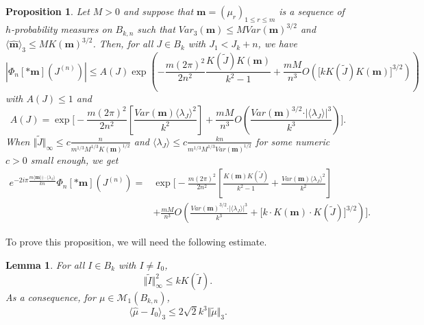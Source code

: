 \documentclass[10pt,11pt]{amsart}%
\newtheorem{lemma}[theorem]{Lemma}
\newtheorem{proposition}[theorem]{Proposition}
\begin{document}
\begin{proposition}\label{prop:convergence_fourier}
Let $M>0$ and suppose that $\mathbf{m}=(\mu_r)_{1\leq r\leq m}$ is a sequence of $h$-probability measures on $ B_{k,n}$ such that $Var_{3}(\mathbf{m})\leq M Var(\mathbf{m})^{3/2}$ and $\langle\widehat{\mathbf{m}}\rangle_3\leq MK(\mathbf{m})
^{3/2}$. Then, for all $J\in B_{k}$ with $J_1<J_k+n$, we have 
$$\left\vert\Phi_{n}[*\mathbf{m}](J^{(n)})\right\vert \leq A(J) \exp\left(-\frac{m(2\pi)^2}{2n^2}\frac{K(\tilde{J})K(\mathbf{m})}{k^2-1}+\frac{mM}{n^3}O\left(\Big[kK(\tilde{J})K(\mathbf{m})\Big]^{3/2}\right)\right)$$
with $A(J)\leq 1$ and 
$$A(J)=\exp\Bigg[-\frac{m(2\pi)^2}{2n^2}\left[\frac{Var(\mathbf{m})\langle \lambda_J\rangle^2}{k^2}\right]+\frac{mM}{n^3}O\left(\frac{Var(\mathbf{m})^{3/2}\cdot\vert\langle \lambda_J\rangle\vert^3}{k^3}\right)\Bigg].$$
When $\Vert \tilde{J}\Vert_{\infty}\leq c\frac{n}{m^{1/3}M^{1/3}K(\mathbf{m})^{1/2}}$ and $\langle \lambda_J\rangle\leq c\frac{kn}{m^{1/3}M^{1/3}Var(\mathbf{m})^{1/2}}$ for some numeric $c>0$ small enough, we get
\begin{align*}
e^{-2i \pi \frac{m\langle\mathbf{m}\rangle)\cdot\langle \lambda_J\rangle}{kn}}\Phi_{n}[*\mathbf{m}](J^{(n)})
=&\exp\Bigg[-\frac{m(2\pi)^2}{2n^2}\left[\frac{K(\mathbf{m})K(\tilde{J})}{k^2-1}+\frac{Var(\mathbf{m})\langle \lambda_J\rangle^2}{k^2}\right]\\
&+\frac{mM}{n^3}O\left(\frac{Var(\mathbf{m})^{3/2}\cdot\vert\langle \lambda_J\rangle\vert^3}{k^3}+\Big[k \cdot K(\mathbf{m})\cdot K(\tilde{J})\Big]^{3/2}\right)\Bigg].
\end{align*}

\end{proposition}
To prove this proposition, we will need the following estimate.
\begin{lemma}\label{lem:bound_K_norm_inf}
For all $I\in B_{k}$ with $I\not=I_0$,
$$\Vert \tilde{I}\Vert_{\infty}^2\leq kK(\tilde{I}).$$
As a consequence, for $\mu\in \mathcal{M}_{1}(B_{k,n})$,
$$\langle\hat{\mu}-I_0\rangle_3\leq 2\sqrt{2}k^3\Vert \tilde{\mu}\Vert_{3}.$$
\end{lemma}
\end{document}
